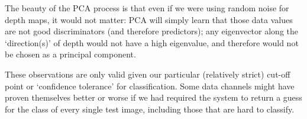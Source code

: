 The beauty of the PCA process is that even if we were using random noise for depth maps, it would not matter: PCA will simply learn that those data values are not good discriminators (and therefore predictors); any eigenvector along the `direction(s)' of depth would not have a high eigenvalue, and therefore would not be chosen as a principal component.

These observations are only valid given our particular (relatively strict) cut-off point or `confidence tolerance' for classification. Some data channels might have proven themselves better or worse if we had required the system to return a guess for the class of every single test image, including those that are hard to classify.

\begin{figure}[p]
 \centering

 \\


\end{figure}
